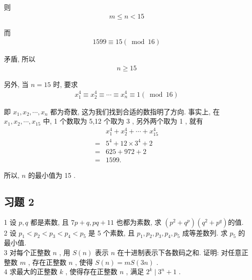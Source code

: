 则
\begin{align*}
	m \leqslant n<15
\end{align*}

而
\begin{align*}
	1599 \equiv 15(\bmod 16)
\end{align*}

矛盾, 所以
\begin{align*}
	n \geqslant 15
\end{align*}

另外, 当 $n=15$ 时, 要求
\begin{align*}
	x_{1}^{4} \equiv x_{2}^{4} \equiv \cdots \equiv x_{n}^{4} \equiv 1(\bmod 16)
\end{align*}

即 $x_{1}, x_{2}, \cdots, x_{n}$ 都为奇数, 这为我们找到合适的数指明了方向. 事实上, 在 $x_{1}, x_{2}, \cdots, x_{15}$ 中, 1 个数取为 5,12 个取为 3 , 另外两个取为 1 , 就有\begin{align}
	  & x_{1}^{4}+x_{2}^{4}+\cdots+x_{15}^{4} \\
	= & 5^{4}+12 \times 3^{4}+2               \\
	= & 625+972+2                             \\
	= & 1599 .
\end{align}

所以, $n$ 的最小值为 15 .

\subsection*{习题 2}
1 设 $p ,  q$ 都是素数, 且 $7 p+q, p q+11$ 也都为素数, 求 $\left(p^{2}+q^{p}\right)\left(q^{2}+p^{q}\right)$的值. \\
2 设 $p_{1}<p_{2}<p_{3}<p_{4}<p_{5}$ 是 5 个素数, 且 $p_{1}, p_{2}, p_{3}, p_{4}, p_{5}$ 成等差数列. 求 $p_{5}$ 的最小值.\\
3 对每个正整数 $n$ , 用 $S(n)$ 表示 $n$ 在十进制表示下各数码之和. 证明: 对任意正整数 $m$ , 存在正整数 $n$ , 使得 $S(n)=m S(3 n)$ . \\
4 求最大的正整数 $k$ , 使得存在正整数 $n$ , 满足 $2^{k} \mid 3^{n}+1$ .

